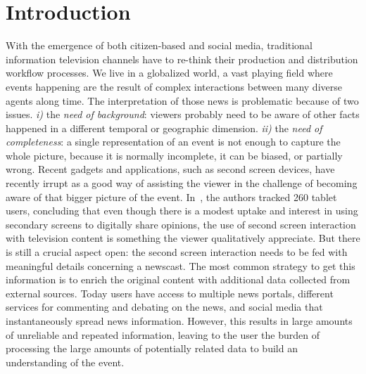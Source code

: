 \documentclass{llncs}
\begin{document}
\section{Introduction}
\label{sec:introduction}
With the emergence of both citizen-based and social media, traditional information television channels have to re-think their production and distribution workflow processes. We live in a globalized world, a vast playing field where events happening are the result of complex interactions between many diverse agents along time. The interpretation of those news is problematic because of two issues. \textit{i)} the \textit{need of background}: viewers probably need to be aware of other facts happened in a different temporal or geographic dimension.
\textit{ii)} the \textit{need of completeness}: a single representation of an event is not enough to capture the whole picture, because it is normally incomplete, it can be biased, or partially wrong. 
Recent gadgets and applications, such as second screen devices, have recently irrupt as a good way of assisting the viewer in the challenge of becoming aware of
that bigger picture of the event. In~\cite{Courtois2012}, the authors tracked 260 tablet users, concluding that even though there is a modest uptake and interest in using secondary screens to digitally share opinions, the use of second screen interaction with television content is something the viewer qualitatively appreciate.
But there is still a crucial aspect open: the second screen interaction needs to be fed with meaningful details concerning a newscast. The most common strategy to get this information is to enrich the original content with additional data collected from external sources. Today users have access to multiple news portals, different services for commenting and debating on the news, and social media that instantaneously spread news information. However, this results in large amounts of unreliable and repeated information, leaving to the user the burden of processing the large amounts of potentially related data to build an understanding of the event.
\end{document}
